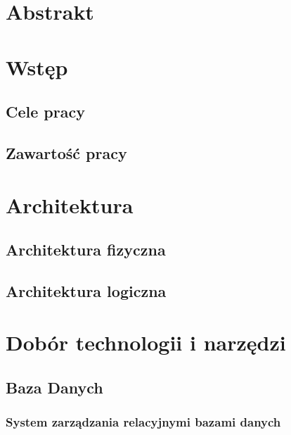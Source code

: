 \documentclass[11pt]{aghdpl}
\author{Mateusz Kulpa}
\date{2014}
\begin{document}
\titlepages
\setcounter{tocdepth}{3}
\tableofcontents
\clearpage

\chapter{Abstrakt}


\chapter{Wstęp}
\label{cha:wstep}

\section{Cele pracy}
\label{sec:celePracy}

\section{Zawartość pracy}
\label{sec:zawartoscPracy}


\chapter{Architektura}

\section{Architektura fizyczna}
\section{Architektura logiczna}


\chapter{Dobór technologii i narzędzi}

\section{Baza Danych}
\subsection{System zarządzania relacyjnymi bazami danych}
\end{document}
